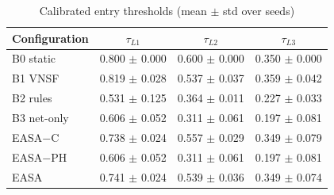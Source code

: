 \begin{table}[H]
\caption{Calibrated entry thresholds (mean $\pm$ std over seeds)}
\label{tab:thresholds}
\centering\footnotesize
\begin{tabular}{lccc}
\toprule
Configuration & $\tau_{L1}$ & $\tau_{L2}$ & $\tau_{L3}$ \\
\midrule
B0 static & 0.800 $\pm$ 0.000 & 0.600 $\pm$ 0.000 & 0.350 $\pm$ 0.000 \\
B1 VNSF & 0.819 $\pm$ 0.028 & 0.537 $\pm$ 0.037 & 0.359 $\pm$ 0.042 \\
B2 rules & 0.531 $\pm$ 0.125 & 0.364 $\pm$ 0.011 & 0.227 $\pm$ 0.033 \\
B3 net-only & 0.606 $\pm$ 0.052 & 0.311 $\pm$ 0.061 & 0.197 $\pm$ 0.081 \\
EASA$-$C & 0.738 $\pm$ 0.024 & 0.557 $\pm$ 0.029 & 0.349 $\pm$ 0.079 \\
EASA$-$PH & 0.606 $\pm$ 0.052 & 0.311 $\pm$ 0.061 & 0.197 $\pm$ 0.081 \\
EASA & 0.741 $\pm$ 0.024 & 0.539 $\pm$ 0.036 & 0.349 $\pm$ 0.074 \\
\bottomrule
\end{tabular}
\end{table}
